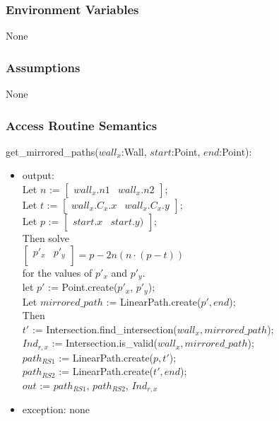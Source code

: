 \documentclass[12pt, titlepage]{article}
\begin{document}
\subsubsection{Environment Variables} None

\subsubsection{Assumptions} None

\subsubsection{Access Routine Semantics}

\noindent get\_mirrored\_paths($wall_x$:Wall, $start$:Point, $end$:Point):
\begin{itemize}
\item output: \\
Let $n$ := $\begin{bmatrix}
wall_x.n1 & wall_x.n2
\end{bmatrix}$;\\
Let $t$ := $\begin{bmatrix}
wall_x.C_x.x & wall_x.C_x.y
\end{bmatrix}$;\\
Let $p$ := $\begin{bmatrix}
start.x & start.y)
\end{bmatrix}$;\\
Then solve\\
$\begin{bmatrix}
p'_x & p'_y\\
\end{bmatrix} = p-2n(n\cdot(p-t))$\\
for the values of $p'_x$ and $p'_y$.\\
let $p'$ := Point.create($p'_x$, $p'_y$);\\
Let $mirrored\_path$ := LinearPath.create($p',end$);\\
Then\\
$t'$ := Intersection.find\_intersection($wall_x, mirrored\_path$);\\
$Ind_{r,x}$ := Intersection.is\_valid($wall_x, mirrored\_path$);\\
$path_{RS1}$ := LinearPath.create($p,t'$);\\
$path_{RS2}$ := LinearPath.create($t',end$);\\
$out$ := $path_{RS1}$, $path_{RS2}$, $Ind_{r,x}$
\item exception: none
\end{itemize}
\end{document}
